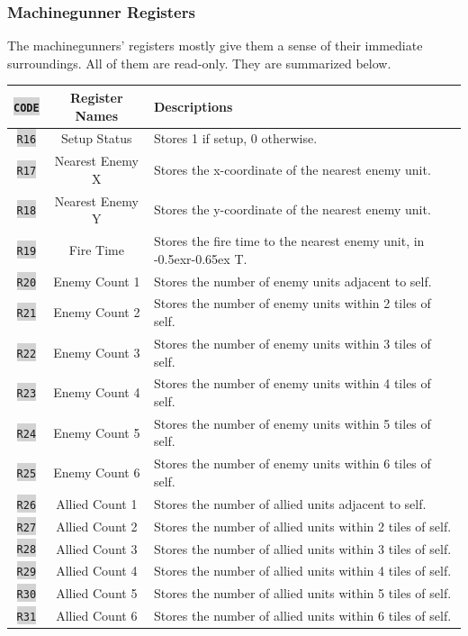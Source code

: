 \documentclass{article}
\newcommand{\vnscode}[1]{\colorbox{lightgray}{\lstinline[language=vns]{#1}}}
\newcommand{\RT}{\lower-0.5ex\hbox{r}\kern-0.65ex T}
\begin{document}
\subsubsection{Machinegunner Registers}

The machinegunners' registers mostly give them a sense of their immediate
surroundings. All of them are read-only. They are summarized below.

\begin{minipage}{\textwidth}
\centering
\begin{tabular}{|c|c|l|}
    \hline \vnscode{CODE} & Register Names & Descriptions \\ \hline
    \vnscode{R16} & Setup Status & Stores 1 if setup, 0 otherwise. \\ \hline
    \vnscode{R17} & Nearest Enemy X & Stores the x-coordinate of the nearest enemy unit. \\ \hline
    \vnscode{R18} & Nearest Enemy Y & Stores the y-coordinate of the nearest enemy unit. \\ \hline
    \vnscode{R19} & Fire Time & Stores the fire time to the nearest enemy unit, in \RT. \\ \hline
    \vnscode{R20} & Enemy Count 1 & Stores the number of enemy units adjacent to self. \\ \hline
    \vnscode{R21} & Enemy Count 2 & Stores the number of enemy units within 2 tiles of self. \\ \hline
    \vnscode{R22} & Enemy Count 3 & Stores the number of enemy units within 3 tiles of self. \\ \hline
    \vnscode{R23} & Enemy Count 4 & Stores the number of enemy units within 4 tiles of self. \\ \hline
    \vnscode{R24} & Enemy Count 5 & Stores the number of enemy units within 5 tiles of self. \\ \hline
    \vnscode{R25} & Enemy Count 6 & Stores the number of enemy units within 6 tiles of self. \\ \hline
    \vnscode{R26} & Allied Count 1 & Stores the number of allied units adjacent to self. \\ \hline
    \vnscode{R27} & Allied Count 2 & Stores the number of allied units within 2 tiles of self. \\ \hline
    \vnscode{R28} & Allied Count 3 & Stores the number of allied units within 3 tiles of self. \\ \hline
    \vnscode{R29} & Allied Count 4 & Stores the number of allied units within 4 tiles of self. \\ \hline
    \vnscode{R30} & Allied Count 5 & Stores the number of allied units within 5 tiles of self. \\ \hline
    \vnscode{R31} & Allied Count 6 & Stores the number of allied units within 6 tiles of self. \\ \hline
\end{tabular}
\end{minipage}
\end{document}
